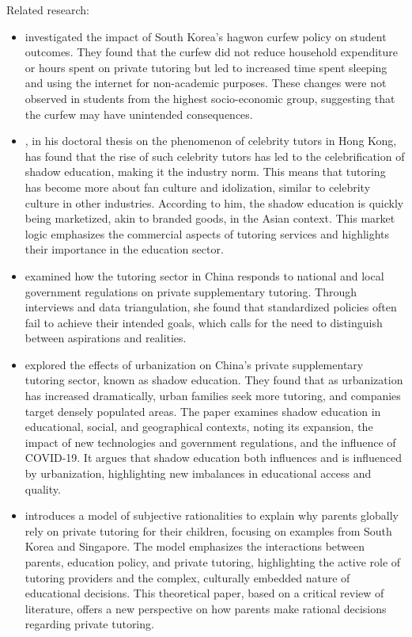 \documentclass[12pt,a4paper,onecolumn]{article}
\numberwithin{equation}{section}
\begin{document}
Related research:
\begin{itemize}
    \item \textcite{choi2016evaluating} investigated the impact of South Korea's hagwon curfew policy on student outcomes. They found that the curfew did not reduce household expenditure or hours spent on private tutoring but led to increased time spent sleeping and using the internet for non-academic purposes. These changes were not observed in students from the highest socio-economic group, suggesting that the curfew may have unintended consequences.
    \item \textcite{lai2019celebrity}, in his doctoral thesis on the phenomenon of celebrity tutors in Hong Kong, has found that the rise of such celebrity tutors has led to the celebrification of shadow education, making it the industry norm. This means that tutoring has become more about fan culture and idolization, similar to celebrity culture in other industries. According to him, the shadow education is quickly being marketized, akin to branded goods, in the Asian context. This market logic emphasizes the commercial aspects of tutoring services and highlights their importance in the education sector.
    \item \textcite{zhang2019regulating} examined how the tutoring sector in China responds to national and local government regulations on private supplementary tutoring. Through interviews and data triangulation, she found that standardized policies often fail to achieve their intended goals, which calls for the need to distinguish between aspirations and realities. 
    \item \textcite{zhang2021changing} explored the effects of urbanization on China’s private supplementary tutoring sector, known as shadow education. They found that as urbanization has increased dramatically, urban families seek more tutoring, and companies target densely populated areas. The paper examines shadow education in educational, social, and geographical contexts, noting its expansion, the impact of new technologies and government regulations, and the influence of COVID-19. It argues that shadow education both influences and is influenced by urbanization, highlighting new imbalances in educational access and quality.
    \item \textcite{tan2022private} introduces a model of subjective rationalities to explain why parents globally rely on private tutoring for their children, focusing on examples from South Korea and Singapore. The model emphasizes the interactions between parents, education policy, and private tutoring, highlighting the active role of tutoring providers and the complex, culturally embedded nature of educational decisions. This theoretical paper, based on a critical review of literature, offers a new perspective on how parents make rational decisions regarding private tutoring.

\end{itemize}
\end{document}
